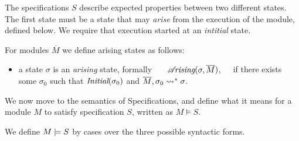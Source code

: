 {{The specifications $S$ describe expected properties between two different states. The first state must be a state that may \emph{arise} from the execution of the module, defined below. We require that execution started at an \emph{intitial} state. %


\begin{definition}
\label{def:arising}
For modules $\overline M$ we define arising  states as follows:

\begin{itemize}
\item
 a state $\sigma$ is 
{ an \emph{arising} state, formally \ \ \  $\mathcal{A}\!\textit{rising}(\sigma, \overline{M})$,\ \ \ if  there exists some $\sigma_0$ such that $\textit{Initial}(\sigma_0)$ and
$\overline{M}, {\sigma_0} \leadsto^* {\sigma}$.}
\end{itemize}
\end{definition}
  
We now move to the semantics of \SpecLang Specifications, and   define what it means for  a module  $M$ to satisfy specification  $S$, written as $M \vDash S$.  
 
\begin{definition}%

We define $M \models {S}$ by cases over the three 
possible syntactic forms.

\label{def:necessity-semantics}


\end{definition}}}
